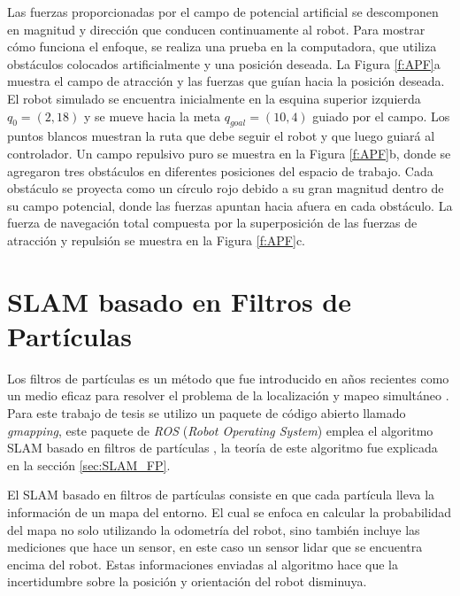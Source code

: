 Las fuerzas proporcionadas por el campo de potencial artificial se descomponen en 
magnitud y dirección que conducen continuamente al robot. Para mostrar cómo funciona el 
enfoque, se realiza una prueba en la computadora, que utiliza obstáculos 
colocados artificialmente y una posición deseada. La Figura \ref{f:APF}a muestra el campo 
de atracción y las fuerzas que guían hacia la posición deseada. El robot simulado se 
encuentra inicialmente en la esquina superior izquierda $q_{0} = (2,18)$ y se mueve hacia 
la meta $q_{goal} = (10,4)$ guiado por el campo. Los puntos blancos muestran la ruta que debe 
seguir el robot y que luego guiará al controlador. Un campo repulsivo puro se muestra en 
la Figura \ref{f:APF}b, donde se agregaron tres obstáculos en diferentes posiciones del espacio de 
trabajo. Cada obstáculo se proyecta como un círculo rojo debido a su gran magnitud dentro de 
su campo potencial, donde las fuerzas apuntan hacia afuera en cada obstáculo. La fuerza de 
navegación total compuesta por la superposición de las fuerzas de atracción y repulsión se 
muestra en la Figura \ref{f:APF}c.

\section{SLAM basado en Filtros de Part\'iculas}

Los filtros de partículas es un método que fue introducido en años recientes como un medio 
eficaz para resolver el problema de la localización y mapeo simultáneo 
\cite{nummiaro2003adaptive}. Para este trabajo de tesis se utilizo un paquete de código 
abierto llamado \textit{gmapping}, este paquete de \textit{ROS} (\textit{Robot Operating System}) 
emplea el algoritmo SLAM basado en filtros de partículas \cite{grisetti2007improved}, la teoría
de este algoritmo fue explicada en la sección \ref{sec:SLAM_FP}.

El SLAM basado en filtros de partículas consiste en que cada partícula lleva la información de 
un mapa del entorno. El cual se enfoca en calcular la probabilidad del mapa no solo utilizando 
la odometría del robot, sino también incluye las mediciones que hace un sensor, en este caso un 
sensor lidar que se encuentra encima del robot. Estas informaciones enviadas al algoritmo hace 
que la incertidumbre sobre la posición y orientación del robot disminuya. 


